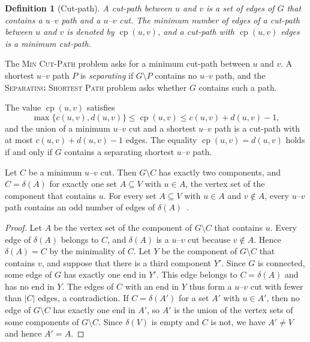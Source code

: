 \documentclass[pdflatex,sn-mathphys-num]{sn-jnl}%
\theoremstyle{thmstyleone}%
\theoremstyle{thmstyletwo}%
\theoremstyle{thmstylethree}%
\newtheorem{definition}{Definition}%
\newcommand{\cp}{\operatorname{cp}}%
\newcommand{\MinCutPath}{\textsc{Min Cut-Path}}%
\newcommand{\SSP}{\textsc{Separating Shortest Path}}%
\begin{document}
\begin{definition}[Cut-path]
\label{def:cut-path}
A \emph{cut-path} between $u$ and $v$ is a set of edges of $G$ that contains a $u$--$v$ path and a $u$--$v$ cut.
The minimum number of edges of a cut-path between $u$ and $v$ is denoted by $\cp(u, v)$, and a cut-path with $\cp(u, v)$ edges is a \emph{minimum cut-path}.
\end{definition}

The \MinCutPath{} problem asks for a minimum cut-path between $u$ and $v$.
A shortest $u$--$v$ path $P$ is \emph{separating} if $G \setminus P$ contains no $u$--$v$ path, and the \SSP{} problem asks whether $G$ contains such a path.

\begin{lemma}
\label{lem:basic-bounds}
The value $\cp(u, v)$ satisfies
\[
\max\{c(u, v), d(u, v)\} \leq \cp(u, v) \leq c(u, v) + d(u, v) - 1,
\]
and the union of a minimum $u$--$v$ cut and a shortest $u$--$v$ path is a cut-path with at most $c(u, v) + d(u, v) - 1$ edges.
The equality $\cp(u, v) = d(u, v)$ holds if and only if $G$ contains a separating shortest $u$--$v$ path.
\end{lemma}

\begin{lemma}
\label{lem:minimum-cuts}
Let $C$ be a minimum $u$--$v$ cut.
Then $G \setminus C$ has exactly two components, and $C = \delta(A)$ for exactly one set $A \subseteq V$ with $u \in A$, the vertex set of the component that contains $u$.
For every set $A \subseteq V$ with $u \in A$ and $v \notin A$, every $u$--$v$ path contains an odd number of edges of $\delta(A)$~\cite[Lemma~5.4]{Michel2026MinCutPath}.
\end{lemma}

\begin{proof}
Let $A$ be the vertex set of the component of $G \setminus C$ that contains $u$.
Every edge of $\delta(A)$ belongs to $C$, and $\delta(A)$ is a $u$--$v$ cut because $v \notin A$.
Hence $\delta(A) = C$ by the minimality of $C$.
Let $Y$ be the component of $G \setminus C$ that contains $v$, and suppose that there is a third component $Y'$.
Since $G$ is connected, some edge of $G$ has exactly one end in $Y'$.
This edge belongs to $C = \delta(A)$ and has no end in $Y$.
The edges of $C$ with an end in $Y$ thus form a $u$--$v$ cut with fewer than $|C|$ edges, a contradiction.
If $C = \delta(A')$ for a set $A'$ with $u \in A'$, then no edge of $G \setminus C$ has exactly one end in $A'$, so $A'$ is the union of the vertex sets of some components of $G \setminus C$.
Since $\delta(V)$ is empty and $C$ is not, we have $A' \neq V$ and hence $A' = A$.
\end{proof}
\end{document}
